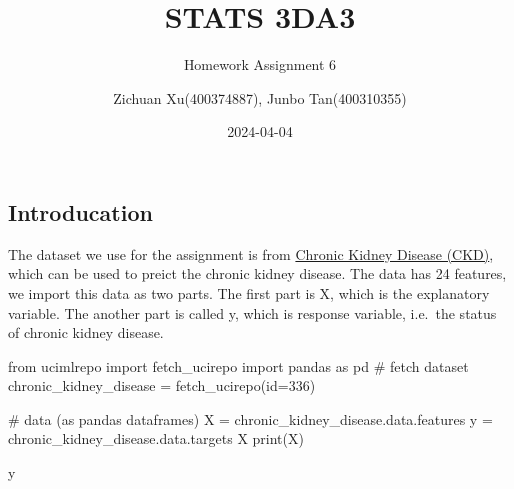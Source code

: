 \documentclass[
  11pt,
  letterpaper,
  DIV=11,
  numbers=noendperiod]{scrartcl}
\title{STATS 3DA3}
\subtitle{Homework Assignment 6}
\author{Zichuan Xu(400374887), Junbo Tan(400310355)}
\date{2024-04-04}
\newenvironment{Shaded}{\begin{snugshade}}{\end{snugshade}}
\newcommand{\BuiltInTok}[1]{\textcolor[rgb]{0.00,0.23,0.31}{#1}}
\newcommand{\CommentTok}[1]{\textcolor[rgb]{0.37,0.37,0.37}{#1}}
\newcommand{\DecValTok}[1]{\textcolor[rgb]{0.68,0.00,0.00}{#1}}
\newcommand{\ImportTok}[1]{\textcolor[rgb]{0.00,0.46,0.62}{#1}}
\newcommand{\NormalTok}[1]{\textcolor[rgb]{0.00,0.23,0.31}{#1}}
\newcommand{\OperatorTok}[1]{\textcolor[rgb]{0.37,0.37,0.37}{#1}}
\begin{document}
\maketitle

\subsection{Introducation}\label{introducation}

The dataset we use for the assignment is from
\href{https://archive.ics.uci.edu/dataset/336/chronic+kidney+disease}{Chronic
Kidney Disease (CKD)}, which can be used to preict the chronic kidney
disease. The data has 24 features, we import this data as two parts. The
first part is X, which is the explanatory variable. The another part is
called y, which is response variable, i.e.~the status of chronic kidney
disease.

\begin{Shaded}
\begin{Highlighting}[]
\ImportTok{from}\NormalTok{ ucimlrepo }\ImportTok{import}\NormalTok{ fetch\_ucirepo }
\ImportTok{import}\NormalTok{ pandas }\ImportTok{as}\NormalTok{ pd}
\CommentTok{\# fetch dataset }
\NormalTok{chronic\_kidney\_disease }\OperatorTok{=}\NormalTok{ fetch\_ucirepo(}\BuiltInTok{id}\OperatorTok{=}\DecValTok{336}\NormalTok{) }
  
\CommentTok{\# data (as pandas dataframes) }
\NormalTok{X }\OperatorTok{=}\NormalTok{ chronic\_kidney\_disease.data.features }
\NormalTok{y }\OperatorTok{=}\NormalTok{ chronic\_kidney\_disease.data.targets }
\NormalTok{X}
\BuiltInTok{print}\NormalTok{(X)}

\NormalTok{y}
\end{Highlighting}
\end{Shaded}
\end{document}
